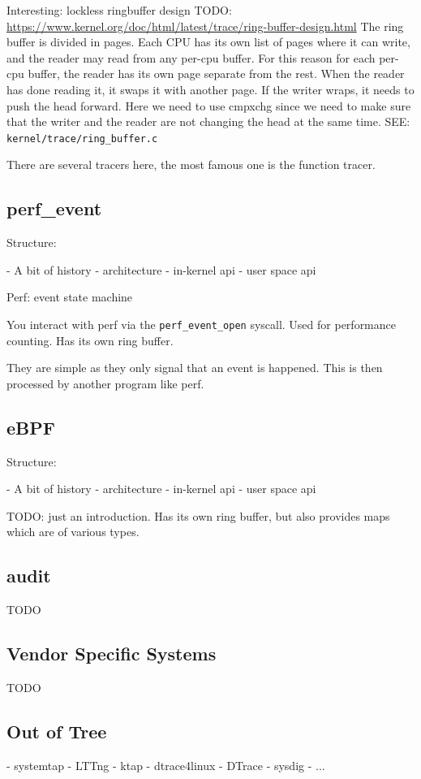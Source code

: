 Interesting: lockless ringbuffer design TODO:
\url{https://www.kernel.org/doc/html/latest/trace/ring-buffer-design.html} The
ring buffer is divided in pages. Each CPU has its own list of pages where it can
write, and the reader may read from any per-cpu buffer. For this reason for each
per-cpu buffer, the reader has its own page separate from the rest. When the
reader has done reading it, it swaps it with another page. If the writer wraps,
it needs to push the head forward. Here we need to use cmpxchg since we need to
make sure that the writer and the reader are not changing the head at the same
time.  SEE: \verb|kernel/trace/ring_buffer.c|

There are several tracers here, the most famous one is the function
tracer.

\subsection{perf\_event}

Structure:

- A bit of history
- architecture
- in-kernel api
- user space api

Perf: event state machine

You interact with perf via the \verb|perf_event_open| syscall.
Used for performance counting. Has its own ring buffer.

They are simple as they only signal that an event is happened. This
is then processed by another program like perf.

\subsection{eBPF}

Structure:

- A bit of history
- architecture
- in-kernel api
- user space api

TODO: just an introduction.
Has its own ring buffer, but also provides maps which are of
various types.

\subsection{audit}

TODO

\subsection{Vendor Specific Systems}

TODO

\subsection{Out of Tree}

  - systemtap
  - LTTng
  - ktap
  - dtrace4linux
  - DTrace
  - sysdig
  - ...
